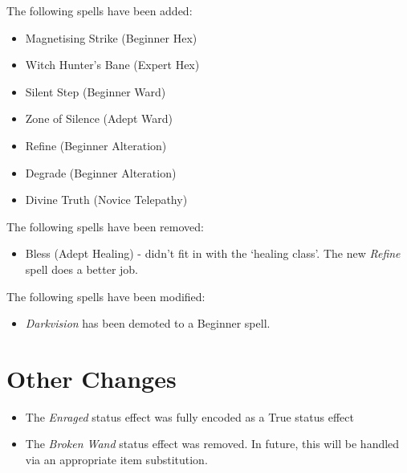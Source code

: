The following spells have been added:
\begin{itemize}
	\item  Magnetising Strike (Beginner Hex)
	\item Witch Hunter's Bane (Expert Hex)
	\item Silent Step (Beginner Ward)
	\item Zone of Silence (Adept Ward)
	\item Refine (Beginner Alteration)
	\item Degrade (Beginner Alteration)
	\item Divine Truth (Novice Telepathy)
\end{itemize}

The following spells have been removed:
\begin{itemize}
	\item Bless (Adept Healing) - didn't fit in with the `healing class'. The new {\it Refine} spell does a better job. 
\end{itemize}

The following spells have been modified:
\begin{itemize}
	\item {\it Darkvision} has been demoted to a Beginner spell.
\end{itemize}

\section{Other Changes}
\begin{itemize}
	\item The {\it Enraged} status effect was fully encoded as a True status effect
	\item The {\it Broken Wand} status effect was removed. In future, this will be handled via an appropriate item substitution.
\end{itemize}

